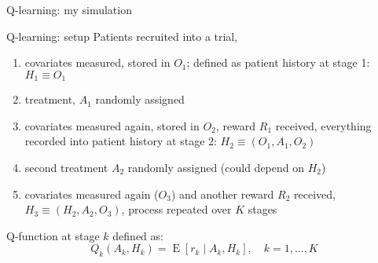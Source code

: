 \documentclass{beamer}
\begin{document}
\begin{frame}{Q-learning: my simulation}
{
  }
\end{frame}


\begin{frame}{Q-learning: setup}
  Patients recruited into a trial,
  \begin{enumerate}[<+(1)->]
    \item covariates measured, stored in $O_{1}$; defined as patient history at stage 1: $H_{1} \equiv O_{1}$
    \item treatment, $A_{1}$ randomly assigned
    \item covariates measured again, stored in $O_{2}$, reward $R_{1}$ received, everything recorded into patient history at stage 2: $H_{2} \equiv (O_{1}, A_{1}, O_{2})$
    \item second treatment $A_{2}$ randomly assigned (could depend on $H_{2}$)
    \item covariates measured again ($O_{3}$) and another reward $R_{2}$ received, $H_{3} \equiv (H_{2}, A_{2}, O_{3})$, process repeated over $K$ stages
  \end{enumerate}
    \pause
Q-function at stage $k$ defined as:
  \begin{equation*}
     Q_{k}(A_{k}, H_{k})  = \operatorname{E}[r_{k} \mid A_{k}, H_{k}], \quad k = 1, \ldots, K
  \end{equation*}
\end{frame}
\end{document}

